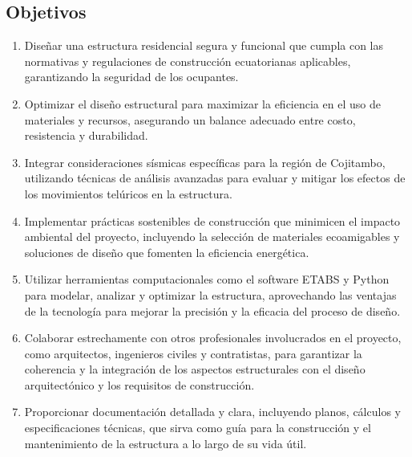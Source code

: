 \documentclass{article}
\begin{document}
\subsection{Objetivos}
\begin{enumerate}[label = \alph*]
    \item Diseñar una estructura residencial segura y funcional que cumpla con las normativas y regulaciones de construcción ecuatorianas aplicables, garantizando la seguridad de los ocupantes.
    \item Optimizar el diseño estructural para maximizar la eficiencia en el uso de materiales y recursos, asegurando un balance adecuado entre costo, resistencia y durabilidad.
    \item Integrar consideraciones sísmicas específicas para la región de Cojitambo, utilizando técnicas de análisis avanzadas para evaluar y mitigar los efectos de los movimientos telúricos en la estructura.
    \item Implementar prácticas sostenibles de construcción que minimicen el impacto ambiental del proyecto, incluyendo la selección de materiales ecoamigables y soluciones de diseño que fomenten la eficiencia energética.
    \item Utilizar herramientas computacionales como el software ETABS y Python para modelar, analizar y optimizar la estructura, aprovechando las ventajas de la tecnología para mejorar la precisión y la eficacia del proceso de diseño.
    \item Colaborar estrechamente con otros profesionales involucrados en el proyecto, como arquitectos, ingenieros civiles y contratistas, para garantizar la coherencia y la integración de los aspectos estructurales con el diseño arquitectónico y los requisitos de construcción.
    \item Proporcionar documentación detallada y clara, incluyendo planos, cálculos y especificaciones técnicas, que sirva como guía para la construcción y el mantenimiento de la estructura a lo largo de su vida útil.
\end{enumerate}
\end{document}
